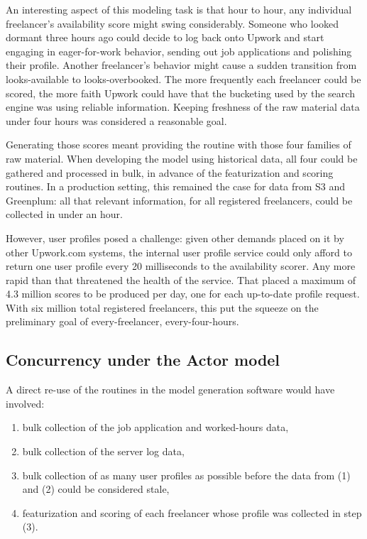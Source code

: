 \documentclass{article}
\begin{document}
An interesting aspect of this modeling task is that hour to hour, any individual freelancer's availability score might swing considerably. Someone who looked dormant three hours ago could decide to log back onto Upwork and start engaging in eager-for-work behavior, sending out job applications and polishing their profile. Another freelancer's behavior might cause a sudden transition from looks-available to looks-overbooked. The more frequently each freelancer could be scored, the more faith Upwork could have that the bucketing used by the search engine was using reliable information. Keeping freshness of the raw material data under four hours was considered a reasonable goal.

Generating those scores meant providing the routine with those four families of raw material. When developing the model using historical data, all four could be gathered and processed in bulk, in advance of the featurization and scoring routines. In a production setting, this remained the case for data from S3 and Greenplum: all that relevant information, for all registered freelancers, could be collected in under an hour. 

However, user profiles posed a challenge: given other demands placed on it by other Upwork.com systems, the internal user profile service could only afford to return one user profile every 20 milliseconds to the availability scorer. Any more rapid than that threatened the health of the service. That placed a maximum of 4.3 million scores to be produced per day, one for each up-to-date profile request. With six million total registered freelancers, this put the squeeze on the preliminary goal of every-freelancer, every-four-hours.

\subsection{Concurrency under the Actor model}

A direct re-use of the routines in the model generation software would have involved: 

\begin{enumerate}
\item bulk collection of the job application and worked-hours data,
\item bulk collection of the server log data,
\item bulk collection of as many user profiles as possible before the data from (1) and (2) could be considered stale, 
\item featurization and scoring of each freelancer whose profile was collected in step (3).
\end{enumerate} 
\end{document}

